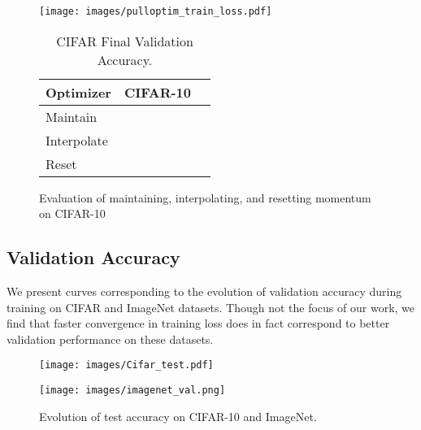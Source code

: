 \documentclass{article}
\begin{document}
\begin{figure}[t]
\centering
\begin{minipage}[t]{0.48 \linewidth}
    \centering
    \texttt{[image: images/pulloptim\_train\_loss.pdf]}
\end{minipage}
\hfill
\begin{minipage}[t]{0.48 \linewidth}
\begin{table}[H]
\begin{center}
\vspace{-1.1in}
\begin{sc}
\begin{tabular}{l c c  }
\toprule
Optimizer & CIFAR-10  \\
\midrule
Maintain &   \\ 
Interpolate &  \\
Reset &   \\ 
\bottomrule
\end{tabular}
\end{sc}
\end{center}
\caption{CIFAR Final Validation Accuracy.}
\label{tabel:cifar-interpolation}
\end{table}
\end{minipage}
\caption{Evaluation of maintaining, interpolating, and resetting momentum on CIFAR-10}
\end{figure}

\subsection{Validation Accuracy}
We present curves corresponding to the evolution of validation accuracy during training on CIFAR and ImageNet datasets. Though not the focus of our work, we find that faster convergence in training loss does in fact correspond to better validation performance on these datasets.


\begin{figure*}
\begin{minipage}[t]{0.48 \linewidth}
    \centering
    \texttt{[image: images/Cifar\_test.pdf]}
\end{minipage}
\hfill
\begin{minipage}[t]{0.48 \linewidth}
    \centering
\texttt{[image: images/imagenet\_val.png]}
\end{minipage}
\centering
\caption{Evolution of test accuracy on CIFAR-10 and ImageNet.}
\vskip -0.1in
\label{fig:cifar-val}
\end{figure*}
\end{document}
